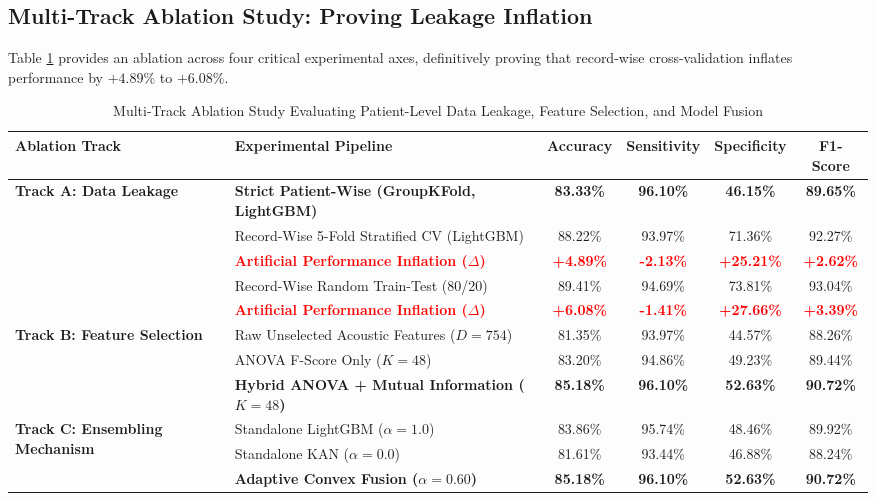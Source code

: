 \documentclass[journal,10pt,twoside]{IEEEtran}
\begin{document}
\subsection{Multi-Track Ablation Study: Proving Leakage Inflation}
Table \ref{tab:ablation} provides an ablation across four critical experimental axes, definitively proving that record-wise cross-validation inflates performance by $+4.89\%$ to $+6.08\%$.

\begin{table}[h]
\caption{Multi-Track Ablation Study Evaluating Patient-Level Data Leakage, Feature Selection, and Model Fusion}
\label{tab:ablation}
\centering
\scriptsize
\begin{tabular}{llcccc}
\toprule
\textbf{Ablation Track} & \textbf{Experimental Pipeline} & \textbf{Accuracy} & \textbf{Sensitivity} & \textbf{Specificity} & \textbf{F1-Score} \\
\midrule
\multirow{4}{*}{\textbf{Track A: Data Leakage}} 
& \textbf{Strict Patient-Wise (GroupKFold, LightGBM)} & \textbf{83.33\%} & \textbf{96.10\%} & \textbf{46.15\%} & \textbf{89.65\%} \\
& Record-Wise 5-Fold Stratified CV (LightGBM) & 88.22\% & 93.97\% & 71.36\% & 92.27\% \\
& \textcolor{red}{\textbf{Artificial Performance Inflation ($\Delta$)}} & \textcolor{red}{\textbf{+4.89\%}} & \textcolor{red}{\textbf{-2.13\%}} & \textcolor{red}{\textbf{+25.21\%}} & \textcolor{red}{\textbf{+2.62\%}} \\
& Record-Wise Random Train-Test (80/20) & 89.41\% & 94.69\% & 73.81\% & 93.04\% \\
& \textcolor{red}{\textbf{Artificial Performance Inflation ($\Delta$)}} & \textcolor{red}{\textbf{+6.08\%}} & \textcolor{red}{\textbf{-1.41\%}} & \textcolor{red}{\textbf{+27.66\%}} & \textcolor{red}{\textbf{+3.39\%}} \\
\midrule
\multirow{3}{*}{\textbf{Track B: Feature Selection}} 
& Raw Unselected Acoustic Features ($D=754$) & 81.35\% & 93.97\% & 44.57\% & 88.26\% \\
& ANOVA F-Score Only ($K=48$) & 83.20\% & 94.86\% & 49.23\% & 89.44\% \\
& \textbf{Hybrid ANOVA + Mutual Information ($K=48$)} & \textbf{85.18\%} & \textbf{96.10\%} & \textbf{52.63\%} & \textbf{90.72\%} \\
\midrule
\multirow{3}{*}{\textbf{Track C: Ensembling Mechanism}} 
& Standalone LightGBM ($\alpha = 1.0$) & 83.86\% & 95.74\% & 48.46\% & 89.92\% \\
& Standalone KAN ($\alpha = 0.0$) & 81.61\% & 93.44\% & 46.88\% & 88.24\% \\
& \textbf{Adaptive Convex Fusion ($\alpha = 0.60$)} & \textbf{85.18\%} & \textbf{96.10\%} & \textbf{52.63\%} & \textbf{90.72\%} \\
\bottomrule
\end{tabular}
\end{table}
\end{document}
